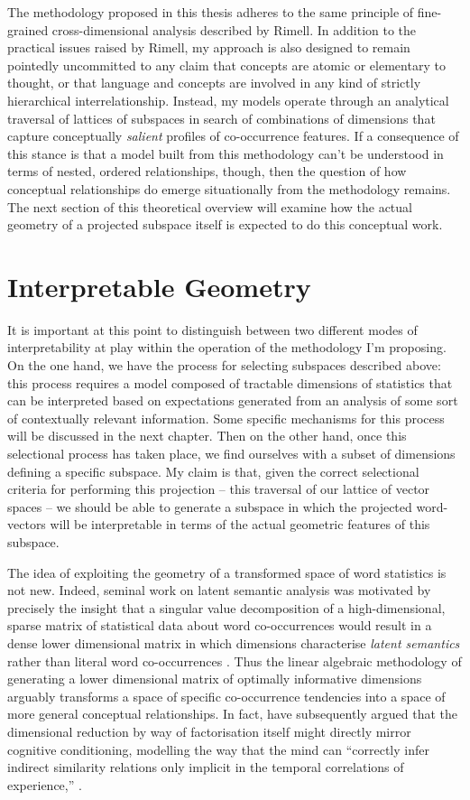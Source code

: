 The methodology proposed in this thesis adheres to the same principle of fine-grained cross-dimensional analysis described by Rimell.  In addition to the practical issues raised by Rimell, my approach is also designed to remain pointedly uncommitted to any claim that concepts are atomic or elementary to thought, or that language and concepts are involved in any kind of strictly hierarchical interrelationship.  Instead, my models operate through an analytical traversal of lattices of subspaces in search of combinations of dimensions that capture conceptually \emph{salient} profiles of co-occurrence features.  If a consequence of this stance is that a model built from this methodology can't be understood in terms of nested, ordered relationships, though, then the question of how conceptual relationships do emerge situationally from the methodology remains.  The next section of this theoretical overview will examine how the actual geometry of a projected subspace itself is expected to do this conceptual work.

\section{Interpretable Geometry}
It is important at this point to distinguish between two different modes of interpretability at play within the operation of the methodology I'm proposing.  On the one hand, we have the process for selecting subspaces described above: this process requires a model composed of tractable dimensions of statistics that can be interpreted based on expectations generated from an analysis of some sort of contextually relevant information.  Some specific mechanisms for this process will be discussed in the next chapter.  Then on the other hand, once this selectional process has taken place, we find ourselves with a subset of dimensions defining a specific subspace.  My claim is that, given the correct selectional criteria for performing this projection -- this traversal of our lattice of vector spaces -- we should be able to generate a subspace in which the projected word-vectors will be interpretable in terms of the actual geometric features of this subspace.

The idea of exploiting the geometry of a transformed space of word statistics is not new.  Indeed, seminal work on latent semantic analysis was motivated by precisely the insight that a singular value decomposition of a high-dimensional, sparse matrix of statistical data about word co-occurrences would result in a dense lower dimensional matrix in which dimensions characterise \emph{latent semantics} rather than literal word co-occurrences \citep{DeerwesterEA1990}.  Thus the linear algebraic methodology of generating a lower dimensional matrix of optimally informative dimensions arguably transforms a space of specific co-occurrence tendencies into a space of more general conceptual relationships.  In fact, \citeauthor{LandauerEA1997} have subsequently argued that the dimensional reduction by way of factorisation itself might directly mirror cognitive conditioning, modelling the way that the mind can ``correctly infer indirect similarity relations only implicit in the temporal correlations of experience,'' \citep[][p. 212]{LandauerEA1997}.

